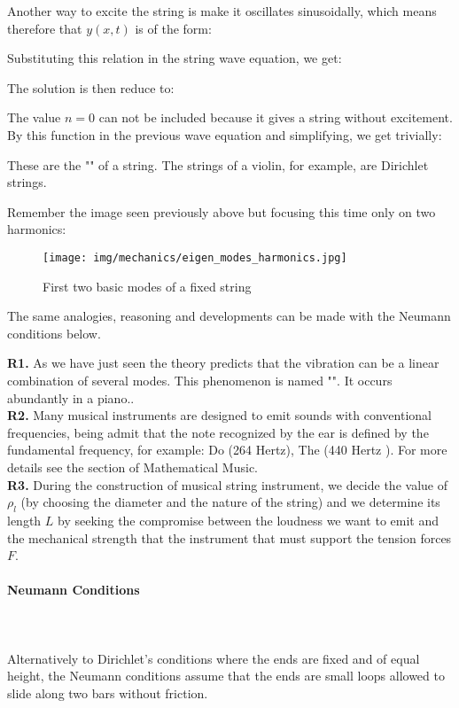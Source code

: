 	Another way to excite the string is make it oscillates sinusoidally, which means therefore that $y(x, t)$ is of the form:
	
	Substituting this relation in the string wave equation, we get:
	
	The solution is then reduce to:
	
	The value $n = 0$ can not be included because it gives a string without excitement. By this function in the previous wave equation and simplifying, we get trivially:
	
	These are the "" of a string. The strings of a violin, for example, are Dirichlet strings.
	
	Remember the image seen previously above but focusing this time only on two harmonics:
	\begin{figure}[H]
		\centering
		\texttt{[image: img/mechanics/eigen\_modes\_harmonics.jpg]}
		\caption{First two basic modes of a fixed string}
	\end{figure}
	The same analogies, reasoning and developments can be made with the Neumann conditions below.
	\begin{tcolorbox}[title=Remarks,colframe=black,arc=10pt]
	\textbf{R1.} As we have just seen the theory predicts that the vibration can be a linear combination of several modes. This phenomenon is named "". It occurs abundantly in a piano..\\
	
	\textbf{R2.} Many musical instruments are designed to emit sounds with conventional frequencies, being admit that the note recognized by the ear is defined by the fundamental frequency, for example: Do (264 Hertz), The (440 Hertz ). For more details see the section of Mathematical Music.\\
	
	\textbf{R3.} During the construction of musical string instrument, we decide the value of $\rho_l$ (by choosing the diameter and the nature of the string) and we determine its length $L$ by seeking the compromise between the loudness we want to emit and the mechanical strength that the instrument that must support the tension forces $F$.
	\end{tcolorbox}
	
	\pagebreak
	\paragraph{Neumann Conditions}\mbox{}\\\\
	Alternatively to Dirichlet's conditions where the ends are fixed and of equal height, the Neumann conditions assume that the ends are small loops allowed to slide along two bars without friction.
	

